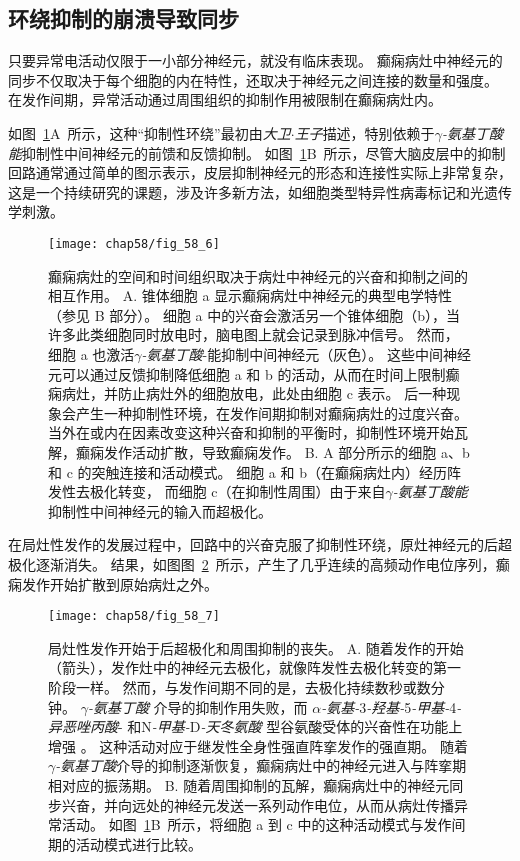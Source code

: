 \subsection{环绕抑制的崩溃导致同步}

只要异常电活动仅限于一小部分神经元，就没有临床表现。
癫痫病灶中神经元的同步不仅取决于每个细胞的内在特性，还取决于神经元之间连接的数量和强度。
在发作间期，异常活动通过周围组织的抑制作用被限制在癫痫病灶内。


如图~\ref{fig:58_6}A~所示，这种“抑制性环绕”最初由\textit{大卫$\cdot$王子}描述，特别依赖于\textit{$\gamma$-氨基丁酸能}抑制性中间神经元的前馈和反馈抑制。
如图~\ref{fig:58_6}B~所示，尽管大脑皮层中的抑制回路通常通过简单的图示表示，皮层抑制神经元的形态和连接性实际上非常复杂，这是一个持续研究的课题，涉及许多新方法，如细胞类型特异性病毒标记和光遗传学刺激。


\begin{figure}[htbp]
	\centering
	\texttt{[image: chap58/fig\_58\_6]}
	\caption{癫痫病灶的空间和时间组织取决于病灶中神经元的兴奋和抑制之间的相互作用。
		A. 锥体细胞 a 显示癫痫病灶中神经元的典型电学特性（参见 B 部分）。
		细胞 a 中的兴奋会激活另一个锥体细胞（b），当许多此类细胞同时放电时，脑电图上就会记录到脉冲信号。
		然而，细胞 a 也激活\textit{$\gamma$-氨基丁酸}-能抑制中间神经元（灰色）。
		这些中间神经元可以通过反馈抑制降低细胞 a 和 b 的活动，从而在时间上限制癫痫病灶，并防止病灶外的细胞放电，此处由细胞 c 表示。
		后一种现象会产生一种抑制性环境，在发作间期抑制对癫痫病灶的过度兴奋。
		当外在或内在因素改变这种兴奋和抑制的平衡时，抑制性环境开始瓦解，癫痫发作活动扩散，导致癫痫发作\cite{lothman1990seizures}。
		B. A 部分所示的细胞 a、b 和 c 的突触连接和活动模式。
		细胞 a 和 b（在癫痫病灶内）经历阵发性去极化转变， 而细胞 c（在抑制性周围）由于来自\textit{$\gamma$-氨基丁酸能}抑制性中间神经元的输入而超极化。}
	\label{fig:58_6}
\end{figure}


在局灶性发作的发展过程中，回路中的兴奋克服了抑制性环绕，原灶神经元的后超极化逐渐消失。
结果，如图图~\ref{fig:58_7}~所示，产生了几乎连续的高频动作电位序列，癫痫发作开始扩散到原始病灶之外。


\begin{figure}[htbp]
	\centering
	\texttt{[image: chap58/fig\_58\_7]}
	\caption{局灶性发作开始于后超极化和周围抑制的丧失\cite{lothman1993neurobiology}。
		A. 随着发作的开始（箭头），发作灶中的神经元去极化，就像阵发性去极化转变的第一阶段一样。
		然而，与发作间期不同的是，去极化持续数秒或数分钟。
		\textit{$\gamma$-氨基丁酸} 介导的抑制作用失败，而 \textit{$\alpha$-氨基-}3\textit{-羟基-}5\textit{-甲基-}4\textit{-异恶唑丙酸}- 和N\textit{-甲基-}D\textit{-天冬氨酸} 型谷氨酸受体的兴奋性在功能上增强 。
		这种活动对应于继发性全身性强直阵挛发作的强直期。
		随着\textit{$\gamma$-氨基丁酸}介导的抑制逐渐恢复，癫痫病灶中的神经元进入与阵挛期相对应的振荡期。
		B. 随着周围抑制的瓦解，癫痫病灶中的神经元同步兴奋，并向远处的神经元发送一系列动作电位，从而从病灶传播异常活动。
		如图~\ref{fig:58_6}B~所示，将细胞 a 到 c 中的这种活动模式与发作间期的活动模式进行比较。}
	\label{fig:58_7}
\end{figure}


